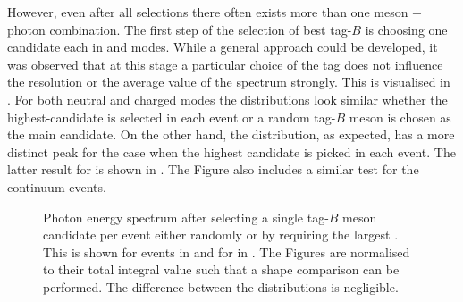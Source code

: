 However, even after all selections there often exists more than one \B meson + photon combination.
The first step of the selection of best tag-$B$ is choosing one candidate each in \feiBp and \feiBz modes.
While a general approach could be developed, it was observed that at this stage a particular choice of the tag does not influence the resolution or the average value of the spectrum strongly.
This is visualised in .
For both neutral and charged \BtoXsgamma modes the distributions look similar whether the highest-\feiProb candidate is selected in each event or a random tag-$B$ meson is chosen as the main candidate.
On the other hand, the \Mbc distribution, as expected, has a more distinct peak for the case when the highest \feiProb candidate is picked in each event.
The latter result for \BtoXsgamma is shown in .
The Figure also includes a similar \Mbc test for the continuum events.

\begin{figure}[htbp!]
    \centering
    \caption{\label{fig:same_mode_best_tag_selection}
    Photon energy spectrum after selecting a single tag-$B$ meson candidate per event either randomly or by requiring the largest \feiProb.
    This is shown for \BptoXsgamma events in  
    and for \BztoXsgamma in .
    The Figures are normalised to their total integral value such that a shape comparison can be performed.
    The difference between the distributions is negligible.
    }
\end{figure}

